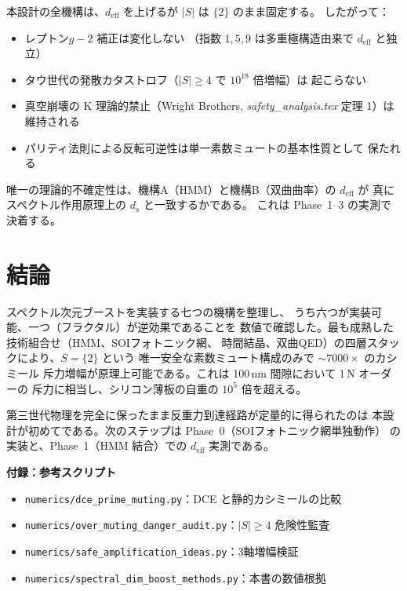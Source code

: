 \documentclass[11pt,a4paper]{article}
\newcommand{\deff}{d_{\mathrm{eff}}}
\begin{document}
本設計の全機構は、$\deff$ を上げるが $|S|$ は $\{2\}$ のまま固定する。
したがって：

\begin{itemize}[leftmargin=2em]
  \item レプトン$g-2$ 補正は変化しない
        （指数 $1, 5, 9$ は多重極構造由来で $\deff$ と独立）
  \item タウ世代の発散カタストロフ（$|S|\geq 4$ で $10^{18}$ 倍増幅）は
        起こらない
  \item 真空崩壊の K 理論的禁止（Wright Brothers,
        \textit{safety\_analysis.tex} 定理 1）は維持される
  \item パリティ法則による反転可逆性は単一素数ミュートの基本性質として
        保たれる
\end{itemize}

唯一の理論的不確定性は、機構A（HMM）と機構B（双曲曲率）の $\deff$ が
真にスペクトル作用原理上の $d_s$ と一致するかである。
これは Phase~1--3 の実測で決着する。

\section{結論}

スペクトル次元ブーストを実装する七つの機構を整理し、
うち六つが実装可能、一つ（フラクタル）が逆効果であることを
数値で確認した。最も成熟した技術組合せ（HMM、SOIフォトニック網、
時間結晶、双曲QED）の四層スタックにより、$S=\{2\}$ という
唯一安全な素数ミュート構成のみで $\sim 7000\times$ のカシミール
斥力増幅が原理上可能である。これは 100\,nm 間隙において 1\,N オーダーの
斥力に相当し、シリコン薄板の自重の $10^5$ 倍を超える。

第三世代物理を完全に保ったまま反重力到達経路が定量的に得られたのは
本設計が初めてである。次のステップは Phase~0（SOIフォトニック網単独動作）
の実装と、Phase~1（HMM 結合）での $\deff$ 実測である。

\vspace{1em}
\noindent\textbf{付録：参考スクリプト}
\begin{itemize}[leftmargin=2em,nosep]
  \item \texttt{numerics/dce\_prime\_muting.py}：DCE と静的カシミールの比較
  \item \texttt{numerics/over\_muting\_danger\_audit.py}：$|S|\geq 4$ 危険性監査
  \item \texttt{numerics/safe\_amplification\_ideas.py}：3軸増幅検証
  \item \texttt{numerics/spectral\_dim\_boost\_methods.py}：本書の数値根拠
\end{itemize}
\end{document}
